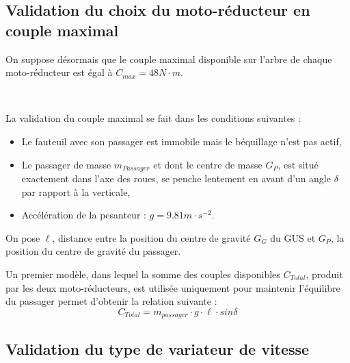 
\subsection{Validation du choix du moto-réducteur en couple maximal}

On suppose désormais que le couple maximal disponible sur l'arbre de chaque moto-réducteur est égal à $C_{max}=48N\cdot m$.

~\

La validation du couple maximal se fait dans les conditions suivantes :
\begin{itemize}
 \item Le fauteuil avec son passager est immobile mais le béquillage n'est pas actif,
 \item Le passager de masse $m_{Passager}$ et dont le centre de masse $G_P$, est situé exactement dans l'axe des roues, se penche lentement en avant d'un angle $\delta$ par rapport à la verticale,
 \item Accélération de la pesanteur : $g=9.81m\cdot s^{-2}$.
\end{itemize}

On pose $\ell$, distance entre la position du centre de gravité $G_G$ du GUS et $G_P$, la position du centre de gravité du passager.

Un premier modèle, dans lequel la somme des couples disponibles $C_{Total}$, produit par les deux moto-réducteurs, est utilisée uniquement pour maintenir l'équilibre du passager permet d'obtenir
la relation suivante :
$$C_{Total}=m_{passager}\cdot g\cdot \ell\cdot sin\delta$$


\subsection{Validation du type de variateur de vitesse}

